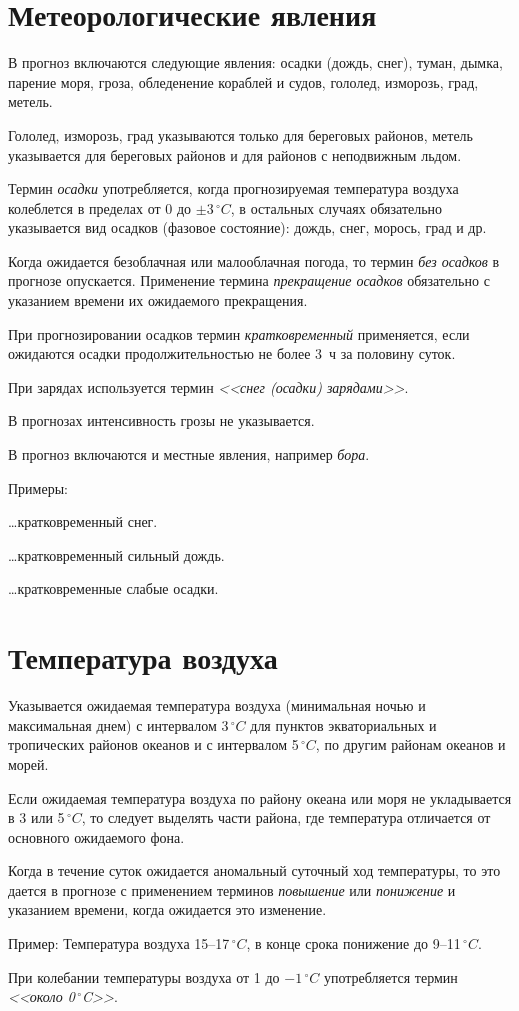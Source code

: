 \documentclass[a4paper, 12pt, twoside, final, book, russian, fittopage, cyremdash, openright]{ncc}
\newcommand{\gr}{\ensuremath{\,^\circ}\xspace}
\newcommand{\grC}{\ensuremath{\,^\circ{}C}\xspace}
\begin{document}
\section{Метеорологические явления}
\label{sec:meteo_phenom}

В прогноз включаются следующие явления: осадки (дождь, снег), туман,
дымка, парение моря, гроза, обледенение кораблей и судов, гололед,
изморозь, град, метель.

Гололед, изморозь, град указываются только для береговых районов,
метель указывается для береговых районов и для районов с неподвижным
льдом.

Термин \textit{осадки} употребляется, когда прогнозируемая температура
воздуха колеблется в пределах от 0 до $\pm3\grC$, в остальных случаях
обязательно указывается вид осадков (фазовое состояние): дождь, снег,
морось, град и др.

Когда ожидается безоблачная или малооблачная погода, то термин
\textit{без осадков} в прогнозе опускается. Применение термина
\textit{прекращение осадков} обязательно с указанием времени их
ожидаемого прекращения.

При прогнозировании осадков термин \textit{кратковременный}
применяется, если ожидаются осадки продолжительностью не более 3~ч за
половину суток.

При зарядах используется термин \textit{<<снег (осадки) зарядами>>}.

В прогнозах интенсивность грозы не указывается.

В прогноз включаются и местные явления, например \textit{бора}.

Примеры:
\begin{list}{}{}
\item \ldots{}кратковременный снег.
\item \ldots{}кратковременный сильный дождь.
\item \ldots{}кратковременные слабые осадки.
\end{list}

\section{Температура воздуха}
\label{sec:temp}

Указывается ожидаемая температура воздуха (минимальная ночью и
максимальная днем) с интервалом 3\grC для пунктов экваториальных и
тропических районов океанов и с интервалом 5\grC, по другим районам
океанов и морей.

Если ожидаемая температура воздуха по району океана или моря не укладывается в 3 или  5\grC, то следует выделять части района, где температура отличается от основного ожидаемого фона.

Когда в течение суток ожидается аномальный суточный ход температуры, то это дается в прогнозе с применением терминов
\textit{повышение} или \textit{понижение} и указанием времени, когда ожидается это изменение.

Пример: Температура воздуха 15--17\grC, в конце срока понижение до 9--11\grC.

При колебании температуры воздуха от 1 до $-1\grC$ употребляется термин \textit{<<около 0\gr{}C>>}.

\backmatter{}

\printindex
\end{document}
